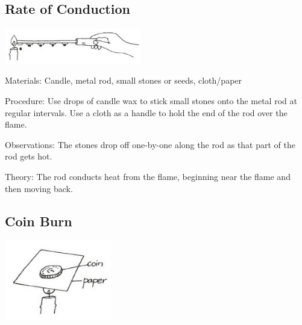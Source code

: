 \begin{multicols}{2}
\subsection{Rate of Conduction}

\begin{center}
\includegraphics[width=0.45\textwidth]{./img/vso/conduction-rate.jpg}
\end{center}

\begin{description*}
\item[Materials:]{Candle, metal rod, small stones or seeds, cloth/paper}
\item[Procedure:]{Use drops of candle wax to stick small stones onto the metal rod at regular intervals. Use a cloth as a handle to hold the end of the rod over the flame.}
\item[Observations:]{The stones drop off one-by-one along the rod as that part of the rod gets hot.}
\item[Theory:]{The rod conducts heat from the flame, beginning near the flame and then moving back.}
\end{description*}

\subsection{Coin Burn}

\begin{center}
\includegraphics[width=0.35\textwidth]{./img/vso/coin-burn.jpg}
\end{center}


\end{multicols}
